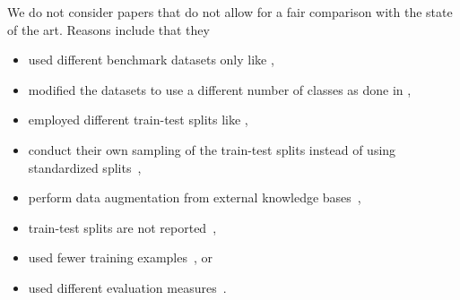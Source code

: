 \documentclass[lettersize,journal]{IEEEtran}
\begin{document}
We do not consider papers that do not allow for a fair comparison with the state of the art.
Reasons include that they 
\begin{itemize}
\item used different benchmark datasets only like \cite{
sharma2025readreinforcementbasedadversariallearning,
petridis2024textclassificationneuralnetworks,
peng2025text,
DBLP:journals/nca/JiaJDZLXC23-mhgat,
10748883-boing-aviation-paper,
LMTCSG-10705790,
AGBESI2024e38515,
10.1007/978-3-031-72350-6_20,
DBLP:journals/corr/abs-2408-15650,
Wei_Sun_2024,
DBLP:conf/kdd/Yu00S24,
DBLP:conf/sigir/DaiYCX24, 
JAMSHIDI2024102306,
DBLP:journals/access/ThaminkaewLV24,
DBLP:journals/tkde/HuLZHNL24,
DBLP:conf/coling/LyKCK24,
DBLP:journals/corr/abs-2401-01667-MLP-Compass,
thaminkaew2024ieeeaccess,
li2023chatgpt,yu2023open,yuan2023revisiting,
zhu2023,
chae_davidson_2023,
zhang2023pretraining,
Yang-ClimateChangeClassifiert-2023,
DBLP:journals/apin/TanRW23,
bgnn-xml,
DBLP:conf/ijcnn/TranSZPB22,
LiuEtAl2022-LongText,
DBLP:conf/aiia/BreazzanoC021a,
DBLP:journals/corr/abs-2206-07253,
DBLP:journals/corr/abs-2112-11389,
chalkidis-etal-2020-empirical,
DBLP:conf/eacl/SchwenkBCL17,gururangan-etal-2019-variational},

\item modified the datasets to use a different number of classes as done in \cite{DBLP:conf/coling/ZhouQZXBX16,DBLP:conf/aaai/LaiXLZ15,MTAPparlakNovelFeatureClassbased2023},

\item employed different train-test splits like
\cite{
donabauer2024tokenlevelgraphsshorttext,
DBLP:journals/eswa/ReusensSTSVBB24,
edwards2024language,
StylianouEtAl2023,
DBLP:journals/corr/abs-2211-02563,
DBLP:conf/ijcnn/SunHCYSM22,
raihan2021-survey,
DBLP:conf/icaart/PalSS20,
moreo2020,
canutoThoroughEvaluationDistanceBased2018}, 

\item conduct their own sampling of the train-test splits instead of using standardized splits~\cite{PAAM-HiA-T5}, 

\item perform data augmentation from external knowledge bases~\cite{zhu2023},

\item train-test splits are not reported~\cite{moreo2020,sf-cnn-iasc.2023.027429,YuanEtAl-MSVM-kNN-2008},

\item used fewer training examples~\cite{
DBLP:conf/acl/LiangZ0Z24,
DBLP:conf/aaai/LiuZ0ZWMCYZ24,
Xie2024DataLT,
zhu2023,
duarte2023review,
DBLP:conf/emnlp/ZhengWYD22,
DBLP:conf/ijcnn/SunHCYSM22,DBLP:conf/emnlp/WangWYD21}, 
or

\item used different evaluation measures~\cite{tan2022,DBLP:conf/emnlp/HuangGKOO21}.

\end{itemize}
\end{document}

